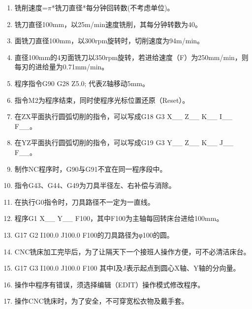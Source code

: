 \documentclass[12pt,twocolumn,landscape,UTF8,twoside,fontset=windows]{ctexart}%
\begin{document}
\begin{enumerate} [1、]
	\item 铣削速度=$\pi$*铣刀直径*每分钟回转数(不考虑单位)。
	\item 铣刀直径100mm，以25m/min速度铣削，其每分钟转数为40。
	\item 面铣刀直径100mm，以300rpm旋转时，切削速度为94m/min。
	\item 直径100mm的4刃面铣刀以350rpm旋转，若进给速度（F）为250mm/min，则每刃的进给量为0.71mm/min。
	\item 程序指令G90 G28 Z5.0; 代表Z轴移动5mm。
	\item 指令M2为程序结束，同时使程序光标位置还原（Reset）。
	\item 在ZX平面执行圆弧切削的指令，可以写成G18 G3 X\_\_ Z\_\_ K\_\_ I\_\_ F\_\_。
	\item 在YZ平面执行圆弧切削的指令，可以写成G19 G3 Y\_\_ Z\_\_ K\_\_ J\_\_ F\_\_。
	\item 制作NC程序时，G90与G91不宜在同一程序段中。
	\item 指令G43、G44、G49为刀具半径左、右补偿与消除。
	\item 在执行G0指令时，刀具路径不一定为一直线。
	\item 程序G1 X\_\_ Y\_\_ F100，其中F100为主轴每回转床台进给100mm。
	\item G17 G2 I100.0 J100.0 F100的刀具路径为φ100的圆。
	\item CNC铣床加工完毕后，为了让隔天下一个接班人操作方便，可不必清洁床台。
	\item G17 G3 I100.0 J100.0 F100 其中I及J表示起点到圆心X轴、Y轴的分向量。
	\item 操作中程序有错误，须选择编辑（EDIT）操作模式修改程序。
	\item 操作CNC铣床时，为了安全，不可穿宽松衣物及戴手套。
\end{enumerate}
\end{document}
